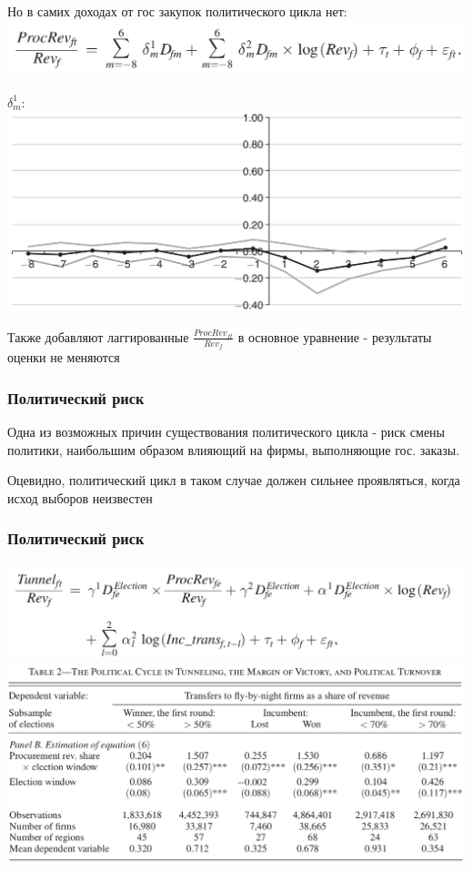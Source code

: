 \begin{frame}
Но в самих доходах от гос закупок политического цикла нет:
\includegraphics[scale=0.3]{images/tunnelling_from_procurement2}\\
\vspace{3mm}

$\delta^1_m$:\\
\includegraphics[scale=0.25]{images/tunnelling_from_procurement3}
\vspace{3mm}

Также добавляют лаггированные $\frac{ProcRev_{ft}}{Rev_f}$ в основное уравнение - результаты оценки не меняются
\end{frame}

\begin{frame}
\frametitle{Политический риск}
Одна из возможных причин существования политического цикла - риск смены политики, наибольшим образом влияющий на фирмы, выполняющие гос. заказы.\\
\vspace{3mm}

Оцевидно, политический цикл в таком случае должен сильнее проявляться, когда исход выборов неизвестен\\
\vspace{3mm}
\end{frame}

\begin{frame}
\frametitle{Политический риск}
\includegraphics[scale=0.25]{images/prisk1}
\includegraphics[scale=0.25]{images/prisk2}
\end{frame}